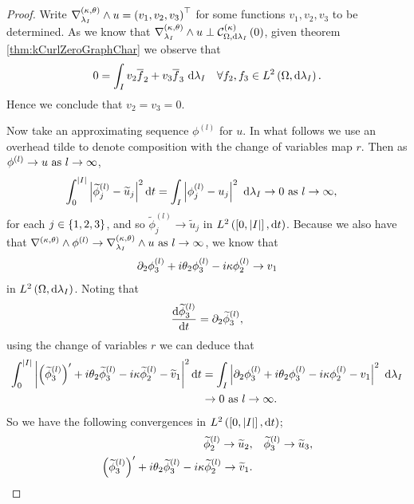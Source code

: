 \begin{proof}
	Write $\nabla_{\lambda_I}^{\left( \kappa, \theta \right)}\wedge u = \left( v_1, v_2, v_3 \right)^{\top}$ for some functions $v_1,v_2,v_3$ to be determined.
	As we know that $\nabla_{\lambda_I}^{\left( \kappa, \theta \right)}\wedge u \perp \mathcal{C}_{ \Omega, \mathrm{d}\lambda_I}^{(\kappa)}\left( 0 \right)$, given theorem \ref{thm:kCurlZeroGraphChar} we observe that
	\begin{align*}
		0 = \int_{I}v_2\overline{f}_2 + v_3\overline{f}_3 \ \mathrm{d}\lambda_I \quad\forall f_2,f_3\in L^{2}\left( \Omega,\mathrm{d}\lambda_I \right).
	\end{align*}
	Hence we conclude that $v_2=v_3=0$. \newline
	
	Now take an approximating sequence $\phi^{(l)}$ for $u$.
	In what follows we use an overhead tilde to denote composition with the change of variables map $r$.
	Then as $\phi^{(l)}\rightarrow u \ \text{as} \ l \rightarrow\infty$,
	\begin{align*}
		\int_0^{\left\lvert I \right\rvert}\left\lvert \widetilde{\phi}^{(l)}_j - \widetilde{u}_j \right\rvert^2 \mathrm{d} t
		&= \int_{I}\left\lvert \phi^{(l)}_j - u_j \right\rvert^2 \ \mathrm{d}\lambda_I
		\rightarrow 0 \ \text{as} \ l \rightarrow\infty,
	\end{align*}
	for each $j\in\left\{ 1,2,3 \right\}$, and so $\widetilde{\phi}^{(l)}_j\rightarrow\widetilde{u}_j$ in $L^{2}\left( \left[ 0,\left\lvert I \right\rvert \right],\mathrm{d}t \right)$.
	Because we also have that $\nabla_{}^{\left( \kappa, \theta \right)}\wedge\phi^{(l)}\rightarrow \nabla_{\lambda_I}^{\left( \kappa, \theta \right)}\wedge u \ \text{as} \ l \rightarrow\infty$, we know that
	\begin{align*}
		\partial_2\phi^{(l)}_3 + i\theta_2\phi^{(l)}_3 - i\kappa\phi^{(l)}_2 \rightarrow v_1
	\end{align*}
	in $L^{2}\left( \Omega,\mathrm{d}\lambda_I \right)$.
	Noting that 
	\begin{align*}
		\dfrac{\mathrm{d}\widetilde{\phi}^{(l)}_3}{\mathrm{d}t} = \partial_2\widetilde{\phi}^{(l)}_3,
	\end{align*}
	using the change of variables $r$ we can deduce that
	\begin{align*}
		\int_0^{\left\lvert I \right\rvert}\left\lvert \left( \widetilde{\phi}^{(l)}_3 \right)' + i\theta_2\widetilde{\phi}^{(l)}_3 - i\kappa\widetilde{\phi}^{(l)}_2 - \widetilde{v}_1 \right\rvert^2 \mathrm{d} t
		&= \int_{I}\left\lvert \partial_2\phi^{(l)}_3 + i\theta_2\phi^{(l)}_3 - i\kappa\phi^{(l)}_2 - v_1 \right\rvert^2 \ \mathrm{d}\lambda_I \\
		&\rightarrow 0 \ \text{as} \ l \rightarrow\infty.
	\end{align*}
	So we have the following convergences in $L^{2}\left( \left[ 0,\left\lvert I \right\rvert \right],\mathrm{d}t \right)$;
	\begin{align*}
		\widetilde{\phi}^{(l)}_2 \rightarrow \widetilde{u}_2,
		&\quad \widetilde{\phi}^{(l)}_3 \rightarrow \widetilde{u}_3, \\
		\bracs{\widetilde{\phi}^{(l)}_3}' + i\qm_2\widetilde{\phi}^{(l)}_3 - i\wavenumber\widetilde{\phi}^{(l)}_2 \rightarrow \widetilde{v}_1. &

\end{align*}
\end{proof}
